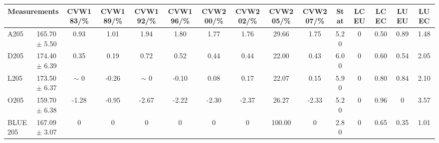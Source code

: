 \begin{table}[H]
\scriptsize
\begin{center}
\renewcommand{\arraystretch}{1.1}
\begin{tabular}{|lc|c|c|c|c|c|c|c|c|ccccc|}
\hline
\multicolumn{2}{|c|}{Measurements} & CVW{\tiny 183}/\%  & CVW{\tiny 189}/\%  & CVW{\tiny 192}/\%  & CVW{\tiny 196}/\%  & CVW{\tiny 200}/\%  & CVW{\tiny 202}/\%  & CVW{\tiny 205}/\%  & CVW{\tiny 207}/\%  & {\tiny Stat} & {\tiny LCEU} & {\tiny LCEC} & {\tiny LUEU} & {\tiny LUEC}\\
\hline
A205 &     165.70 $\pm$       5.50 &       0.93 &       1.01 &       1.94 &       1.80 &       1.77 &       1.76 &      29.66 &       1.75 &       5.20 &  0 &       0.50 &       0.89 &       1.48\\
D205 &     174.40 $\pm$       6.39 &       0.35 &       0.19 &       0.72 &       0.52 &       0.44 &       0.44 &      22.00 &       0.43 &       6.00 &  0 &       0.60 &       0.54 &       2.05\\
L205 &     173.50 $\pm$       6.37 &  {\tiny $\sim$ }0 &      -0.26 &  {\tiny $\sim$ }0 &      -0.10 &       0.08 &       0.17 &      22.07 &       0.15 &       5.90 &  0 &       0.80 &       0.84 &       2.10\\
O205 &     159.70 $\pm$       6.38 &      -1.28 &      -0.95 &      -2.67 &      -2.22 &      -2.30 &      -2.37 &      26.27 &      -2.33 &       5.20 &  0 &       0.96 &  0 &       3.57\\
\hline
BLUE {\tiny 205} &     167.09 $\pm$       3.07 &  0 &  0 &  0 &  0 &  0 &  0 &     100.00 &  0 &       2.80 &  0 &       0.65 &       0.35 &       1.01\\
\hline
\end{tabular}
\renewcommand{\arraystretch}{1}
\end{center}
\end{table}
\vspace*{-0.5cm}
